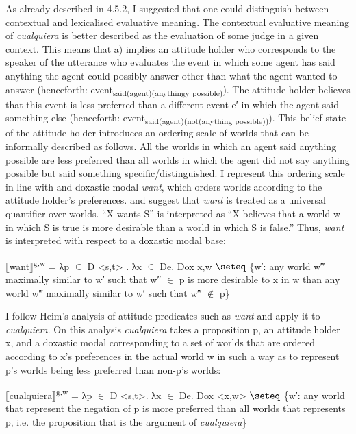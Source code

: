   As already described in 4.5.2, I suggested that one could distinguish between contextual and lexicalised evaluative meaning. The contextual evaluative meaning of \textit{cualquiera} is better described as the evaluation of some judge in a given context. This means that a) implies an attitude holder who corresponds to the speaker of the utterance who evaluates the event in which some agent has said anything the agent could possibly answer other than what the agent wanted to answer (henceforth: event\textsubscript{said(agent)(anythingy possible)}). The attitude holder believes that this event is less preferred than a different event e′ in which the agent said something else (henceforth: event\textsubscript{said(agent)(not(anything possible))}). This belief state of the attitude holder introduces an ordering scale of worlds that can be informally described as follows. All the worlds in which an agent said anything possible are less preferred than all worlds in which the agent did not say anything possible but said something specific/distinguished. I represent this ordering scale in line with \citet{Stalnaker1984} and  doxastic modal \textit{want}, which orders worlds according to the attitude holder’s preferences. \citet{Stalnaker1984} and \citet{Heim1992} suggest that \textit{want} is treated as a universal quantifier over worlds. “X wants S” is interpreted as “X believes that a world w in which S is true is more desirable than a world in which S is false.” Thus, \textit{want} is interpreted with respect to a doxastic modal base: 

    ⟦want⟧\textsuperscript{g,w} = λp ${\in}$ D <s,t> . λx ${\in}$ De. Dox x,w ${\seteq}$ \{w′: any world w‴ maximally similar to w′ such that w″ ${\in}$ p is more desirable to x in w than any world w‴ maximally similar to w′ such that w‴ ${\notin}$ p\}

    \citep[193]{Heim1992}

I follow Heim’s analysis of attitude predicates such as \textit{want} and apply it to \textit{cualquiera}. On this analysis \textit{cualquiera} takes a proposition p, an attitude holder x, and a doxastic modal corresponding to a set of worlds that are ordered according to x’s preferences in the actual world w in such a way as to represent p’s worlds being less preferred than non-p’s worlds:

\label{bkm:Ref150787526}    ⟦cualquiera⟧\textsuperscript{g,w} = λp ${\in}$ D <s,t>. λx ${\in}$ De. Dox <x,w> ${\seteq}$ \{w′: any world that represent the negation of p is more preferred than all worlds that represents p, i.e. the proposition that is the argument of \textit{cualquiera}\}

